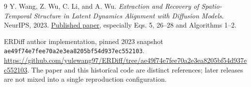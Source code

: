 \documentclass[11pt,a4paper]{article}
\begin{document}
\begin{thebibliography}{9}\small
{}
Y. Wang, Z. Wu, C. Li, and A. Wu.
\emph{Extraction and Recovery of Spatio-Temporal Structure in Latent Dynamics
Alignment with Diffusion Models}. NeurIPS, 2023.
\href{https://proceedings.neurips.cc/paper_files/paper/2023/file/7abbcb05a5d55157ede410bb718e32d7-Paper-Conference.pdf}{Published paper},
especially Eqs. 5, 26--28 and Algorithms 1--2.

ERDiff author implementation, pinned 2023 snapshot
\texttt{ae49f74e7fee70a2e3ea8205bf54d937ec552103}.
\url{https://github.com/yulewang97/ERDiff/tree/ae49f74e7fee70a2e3ea8205bf54d937ec552103}.
The paper and this historical code are distinct references; later releases
are not mixed into a single reproduction configuration.
\end{thebibliography}
\end{document}
